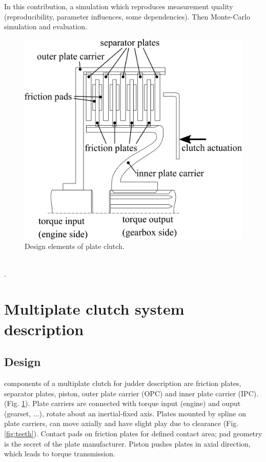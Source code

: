\documentclass[a4paper,fleqn]{cas-dc}
\begin{document}
In this contribution, a simulation which reproduces measurement quality (reproducibility, parameter influences, some dependencies). Then Monte-Carlo simulation and evaluation. 
\begin{figure}
	\centering
	\includegraphics[scale=.75]{figs/Design.png}
	\caption{Design elements of plate clutch. }
	\label{fig:design}
\end{figure}\\
\cite{centea2001non,gregori2014Judder,jacobsson2003Aspects,jahagirdar2007Judder}. 

\section{Multiplate clutch system description}
\subsection{Design}
components of a multiplate clutch for judder description are friction plates, separator plates, piston, outer plate carrier (OPC) and inner plate carrier (IPC). (Fig. \ref{fig:design}). Plate carriers are connected with torque input (engine) and ouput (gearset, ...), rotate about an inertial-fixed axis. Plates mounted by spline on plate carriers, can move axially and have slight play due to clearance (Fig. \ref{fig:teeth}). Contact pads on friction plates for defined contact area; pad geometry is the secret of the plate manufacturer. Piston pushes plates in axial direction, which leads to torque transmission. \\
\end{document}

